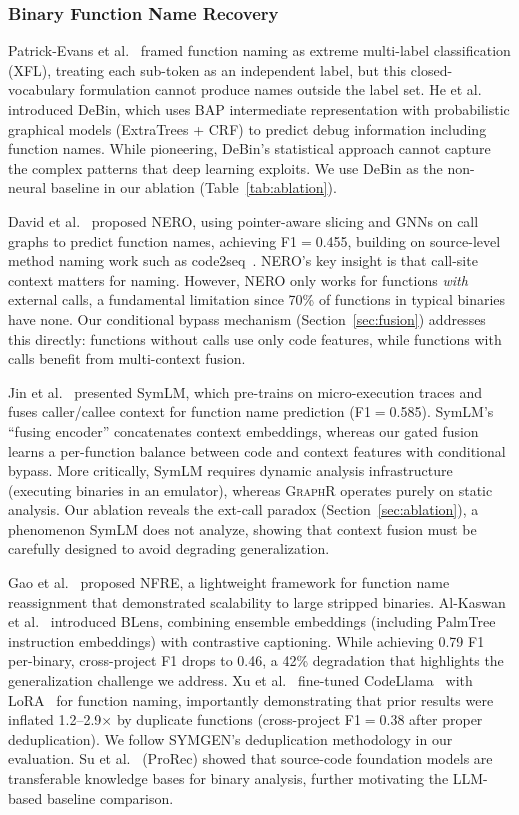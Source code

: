 \documentclass[sigconf,nonacm]{acmart}
\newcommand{\sysname}{\textsc{GraphR}}
\begin{document}
\subsubsection{Binary Function Name Recovery}

Patrick-Evans et al.~\cite{xfl} framed function naming as extreme multi-label classification (XFL), treating each sub-token as an independent label, but this closed-vocabulary formulation cannot produce names outside the label set. He et al.~\cite{debin} introduced DeBin, which uses BAP intermediate representation with probabilistic graphical models (ExtraTrees + CRF) to predict debug information including function names. While pioneering, DeBin's statistical approach cannot capture the complex patterns that deep learning exploits. We use DeBin as the non-neural baseline in our ablation (Table~\ref{tab:ablation}).

David et al.~\cite{nero} proposed NERO, using pointer-aware slicing and GNNs on call graphs to predict function names, achieving F1$=$0.455, building on source-level method naming work such as code2seq~\cite{code2seq}. NERO's key insight is that call-site context matters for naming. However, NERO only works for functions \emph{with} external calls, a fundamental limitation since 70\% of functions in typical binaries have none. Our conditional bypass mechanism (Section~\ref{sec:fusion}) addresses this directly: functions without calls use only code features, while functions with calls benefit from multi-context fusion.

Jin et al.~\cite{symlm} presented SymLM, which pre-trains on micro-execution traces and fuses caller/callee context for function name prediction (F1$=$0.585). SymLM's ``fusing encoder'' concatenates context embeddings, whereas our gated fusion learns a per-function balance between code and context features with conditional bypass. More critically, SymLM requires dynamic analysis infrastructure (executing binaries in an emulator), whereas \sysname{} operates purely on static analysis. Our ablation reveals the ext-call paradox (Section~\ref{sec:ablation}), a phenomenon SymLM does not analyze, showing that context fusion must be carefully designed to avoid degrading generalization.

Gao et al.~\cite{nfre} proposed NFRE, a lightweight framework for function name reassignment that demonstrated scalability to large stripped binaries. Al-Kaswan et al.~\cite{blens} introduced BLens, combining ensemble embeddings (including PalmTree~\cite{palmtree} instruction embeddings) with contrastive captioning. While achieving 0.79 F1 per-binary, cross-project F1 drops to 0.46, a 42\% degradation that highlights the generalization challenge we address. Xu et al.~\cite{symgen} fine-tuned CodeLlama~\cite{codellama} with LoRA~\cite{lora} for function naming, importantly demonstrating that prior results were inflated 1.2--2.9$\times$ by duplicate functions (cross-project F1$=$0.38 after proper deduplication). We follow SYMGEN's deduplication methodology in our evaluation. Su et al.~\cite{prorec} (ProRec) showed that source-code foundation models are transferable knowledge bases for binary analysis, further motivating the LLM-based baseline comparison.
\end{document}
